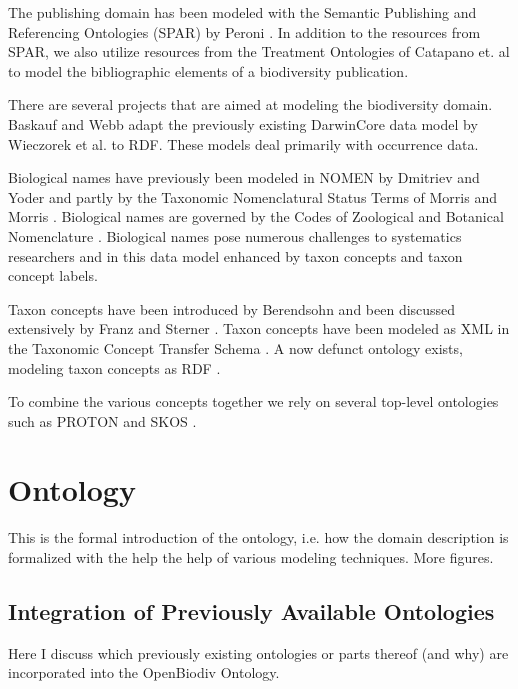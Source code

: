 \documentclass{bmcart}
\begin{document}
The publishing domain has been modeled with the Semantic Publishing and Referencing Ontologies (SPAR) by Peroni \cite{Peroni2014}.  In addition to the resources from SPAR, we also utilize resources from the Treatment Ontologies of Catapano et. al \cite{Catapano} to model the bibliographic elements of a biodiversity publication.

There are several projects that are aimed at modeling the biodiversity domain. Baskauf and Webb \cite{Baskauf2014} adapt the previously existing DarwinCore data model by Wieczorek et al. \cite{Wieczorek2012} to RDF. These models deal primarily with occurrence data.

Biological names have previously been modeled in NOMEN by Dmitriev and Yoder \cite{Dmitriev} and partly by the Taxonomic Nomenclatural Status Terms of Morris and Morris \cite{Morris}. Biological names are governed by the Codes of Zoological and Botanical Nomenclature \cite{W.D.L.Ride2012,McNeill2011}. Biological names pose numerous challenges to systematics researchers \cite{Franz2014} and in this data model enhanced by taxon concepts and taxon concept labels.

Taxon concepts have been introduced by Berendsohn \cite{Berendsohn1995} and been discussed extensively by Franz and Sterner \cite{Franz2008,Sterner2017}. Taxon concepts have been modeled as XML in the Taxonomic Concept Transfer Schema \cite{Group2006}. A now defunct ontology exists, modeling taxon concepts as RDF \cite{DeVries2013}.


To combine the various concepts together we rely on several top-level ontologies such as PROTON \cite{Damova,Base2003} and SKOS \cite{Miles2009}. 

\cite{Obitko2007}

\cite{Guarino2009}



\section*{Ontology}

This is the formal introduction of the ontology, i.e. how the domain description is formalized with the help the help of various modeling techniques. More figures.

\subsection*{Integration of Previously Available Ontologies}

Here I discuss which previously existing ontologies or parts thereof (and why) are incorporated into the  OpenBiodiv Ontology.
\end{document}
